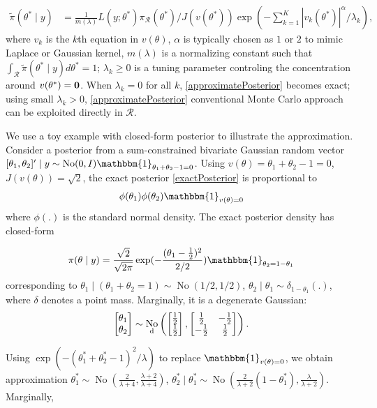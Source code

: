 \documentclass[10pt,fleqn]{article}
\newcommand{\be}{\begin{equation}\begin{aligned}}
\newcommand{\ee}{\end{aligned}\end{equation}}
\newcommand{\mc}[1]{\mathcal{#1}}
\DeclareMathOperator{\No}{No}
\DeclareMathOperator{\1}{\mathbbm{1}}
\begin{document}
\be
\label{approximatePosterior}
\tilde{\pi}(\theta^*\mid y)  & = \frac{1}{m(\lambda)} L(y;\theta^*) \pi_{\mc
R}(\theta^*) /J(v(\theta^*)) \exp (- \sum_{k=1}^K |v_k(\theta^*)|^\alpha/\lambda_k),
\ee
where $v_k$ is the $k$th equation in $v(\theta)$, $\alpha$ is
typically chosen as $1$ or $2$ to mimic Laplace or Gaussian kernel, $m(\lambda)$ is a normalizing
constant such that $\int_{\mc R} \tilde{\pi}(\theta^*\mid y) d\theta^*=1$;
 $\lambda_k\ge 0$ is a
tuning parameter controling the concentration around $v(\theta^*)=\bf 0$.
When $\lambda_k=0$ for all $k$, 
\eqref{approximatePosterior} becomes exact; using small $\lambda_k>0$, \eqref{approximatePosterior}
 conventional Monte Carlo approach can be exploited directly in $\mc R$.

We use a toy example with closed-form posterior to illustrate the  approximation. Consider a posterior from a sum-constrained
bivariate Gaussian random vector $[\theta_1,\theta_2]' \mid y \sim \No(0,I)
\mathbbm{1}_{\theta_1+\theta_2-1=0}$. Using
$v(\theta)=\theta_1+\theta_2-1=0$, $J(v(\theta))=\sqrt 2$, the exact posterior \eqref{exactPosterior} is proportional to 
$$
\phi(\theta_1)
\phi(\theta_2)\mathbbm{1}_{v(\theta)=0}
$$
where $\phi(.)$ is the standard
normal density. The exact posterior density has closed-form

$$
\pi(\theta\mid y)=\frac{\sqrt{2}}{\sqrt{2\pi}} \exp(-\frac{(\theta_1-\frac{1}{2})^2}{2/2})
\mathbbm{1}_{\theta_2=1-\theta_1}
$$
corresponding to $\theta_1\mid (\theta_1+ \theta_2=1) \sim
\No(1/2,1/2)$, $\theta_2\mid \theta_1 \sim \delta_{1-\theta_1}(.)$, where
$\delta$ denotes a point mass. Marginally, it is a degenerate Gaussian:
$$\begin{bmatrix} \theta_1 \\ \theta_2 \end{bmatrix} \sim
\No_{\text d} \left(
\begin{bmatrix} \frac{1}{2} \\ \frac{1}{2} \end{bmatrix},
\begin{bmatrix} \frac{1}{2} & -\frac{1}{2}  \\  -\frac{1}{2}  & \frac{1}{2} \end{bmatrix}
\right).$$

Using $ \exp( - (\theta^*_1+\theta^*_2-1)^2/\lambda)$ to
replace $\mathbbm{1}_{v(\theta)=0}$, we obtain approximation $\theta^*_1 \sim \No(\frac{2}{\lambda+4},\frac{\lambda+2}{\lambda+4})$, $\theta^*_2\mid \theta^*_1 \sim \No(\frac{2}{\lambda+2}(1-\theta^*_1),\frac{\lambda}{\lambda+2})$. Marginally, 
\end{document}
